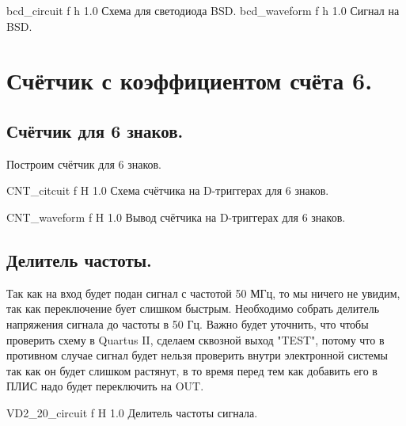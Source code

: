 \documentclass{bmstu}
\begin{document}
	{bcd_circuit}
	{f} %
	{h} %
	{1.0\textwidth} %
	{Схема для светодиода BSD.} %
	{bcd_waveform}
	{f} %
	{h} %
	{1.0\textwidth} %
	{Сигнал на BSD.} %
	
	
	\chapter{Счётчик с коэффициентом счёта 6.}
	
	\section{Счётчик для 6 знаков.}
	\begin{flushleft}
		Построим счётчик для 6 знаков.
	\end{flushleft}

	{CNT_citcuit}
	{f} %
	{H} %
	{1.0\textwidth} %
	{Схема счётчика на D-триггерах для 6 знаков.} %

	{CNT_waveform}
	{f} %
	{H} %
	{1.0\textwidth} %
	{Вывод счётчика на D-триггерах для 6 знаков.} %

	\section{Делитель частоты.}

	\begin{flushleft}
		Так как на вход будет подан сигнал с частотой 50 МГц, то мы
		ничего не увидим, так как переключение бует слишком быстрым.
		Необходимо собрать делитель напряжения сигнала до частоты в
		50 Гц. Важно будет уточнить, что чтобы проверить схему в 
		Quartus II, сделаем сквозной выход "TEST", потому что в 
		противном случае сигнал будет нельзя проверить внутри 
		электронной системы так как он будет слишком растянут, в то 
		время перед тем как добавить его в ПЛИС надо будет переключить на OUT.
	\end{flushleft}

	{VD2_20_circuit}
	{f} %
	{H} %
	{1.0\textwidth} %
	{Делитель частоты сигнала.} %
	
\end{document}
